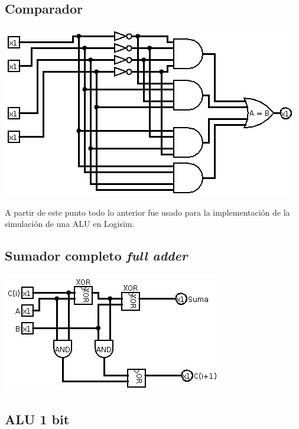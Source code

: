 \documentclass[12pt, letterpaper]{article}
\begin{document}
        \subsection*{Comparador}
          \begin{center}
            \includegraphics[scale=0.4]{comp.png}
          \end{center}

        A partir de este punto todo lo anterior fue usado para la implementación
        de la simulación de una ALU en Logisim.

      \subsection*{Sumador completo \textit{full adder}}

        \begin{center}
          \includegraphics[scale=0.4]{sumador.png}
        \end{center}

      \subsection*{ALU 1 bit}
\end{document}
